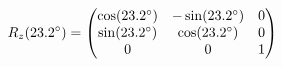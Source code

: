 \documentclass[preview]{standalone}
\begin{document}
\begin{align*}
\special{dvisvgm:raw <g id='unique000'>}R_z(23.2^\circ) = \begin{pmatrix} \cos(23.2^\circ) & -\sin(23.2^\circ) & 0 \\ \sin(23.2^\circ) & \cos(23.2^\circ) & 0 \\ 0 & 0 & 1 \end{pmatrix}\special{dvisvgm:raw </g>}
\end{align*}
\end{document}

